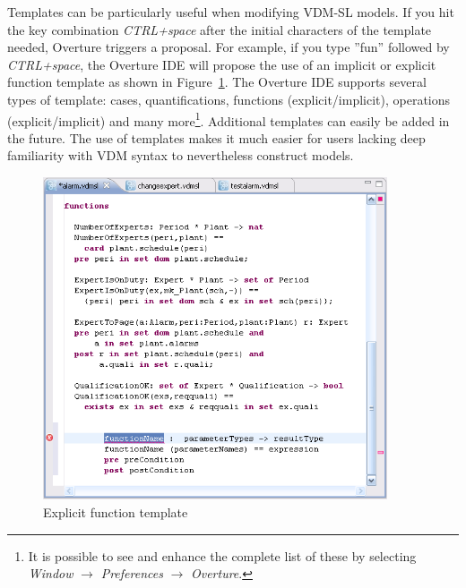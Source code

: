 Templates can be particularly useful when modifying VDM-SL models. If you hit
the key combination \textit{CTRL+space} after the initial characters
of the template needed, Overture triggers a proposal. For example, if
you type ''fun'' followed by \textit{CTRL+space}, the Overture IDE
will propose the use of an implicit or explicit function template as
shown in Figure~\ref{fig:functionTemplate}. The Overture IDE
supports several types of template: cases, quantifications, functions
(explicit/implicit), operations (explicit/implicit) and many
more\footnote{It is possible to see and enhance the complete list of
  these by selecting \emph{Window} $\rightarrow$ \emph{Preferences}
  $\rightarrow$ \emph{Overture}.}. 
Additional templates can easily be added in the future. The use
of templates makes it much easier for users lacking deep familiarity
with VDM syntax to nevertheless construct models.
\begin{figure}
\begin{center}
\includegraphics[width=4in]{figures/FunctionTemplate}
\caption{Explicit function template}
\label{fig:functionTemplate}
\end{center}
\end{figure}

